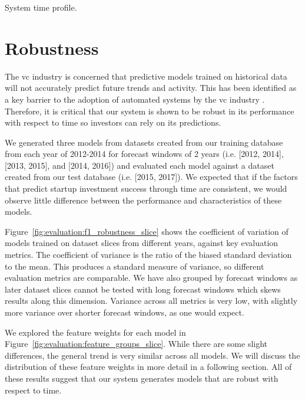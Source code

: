 \documentclass[../thesis/thesis.tex]{subfiles}
\begin{document}
\begin{table}[!htb]
    \centering
    \scalebox{0.9}{}
    \caption[System time profile]{System time profile.}
    \label{tab:evaluation:time_profile}
\end{table}

\section{Robustness}

The \gls{vc} industry is concerned that predictive models trained on historical data will not accurately predict future trends and activity. This  has been identified as a key barrier to the adoption of automated systems by the \gls{vc} industry \cite{stone2014}. Therefore, it is critical that our system is shown to be robust in its performance with respect to time so investors can rely on its predictions.

We generated three models from datasets created from our training database from each year of 2012-2014 for forecast windows of 2 years (i.e. [2012, 2014], [2013, 2015], and [2014, 2016]) and evaluated each model against a dataset created from our test database (i.e. [2015, 2017]). We expected that if the factors that predict startup investment success through time are consistent, we would observe little difference between the performance and characteristics of these models.

Figure~\ref{fig:evaluation:f1_robustness_slice} shows the coefficient of variation of models trained on dataset slices from different years, against key evaluation metrics. The coefficient of variance is the ratio of the biased standard deviation to the mean. This produces a standard measure of variance, so different evaluation metrics are comparable. We have also grouped by forecast windows as later dataset slices cannot be tested with long forecast windows which skews results along this dimension. Variance across all metrics is very low, with slightly more variance over shorter forecast windows, as one would expect.

We explored the feature weights for each model in Figure~\ref{fig:evaluation:feature_groups_slice}. While there are some slight differences, the general trend is very similar across all models. We will discuss the distribution of these feature weights in more detail in a following section. All of these results suggest that our system generates models that are robust with respect to time.
\end{document}
